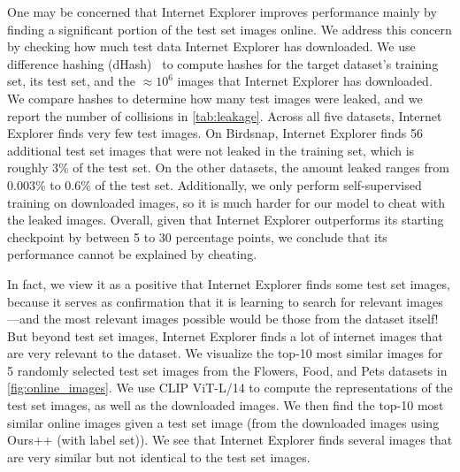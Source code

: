 One may be concerned that Internet Explorer improves performance mainly by finding a significant portion of the test set images online. We address this concern by checking how much test data Internet Explorer has downloaded. We use difference hashing (dHash)~\cite{imagehash} to compute hashes for the target dataset's training set, its test set, and the $\approx 10^6$ images that Internet Explorer has downloaded. We compare hashes to determine how many test images were leaked, and we report the number of collisions in \cref{tab:leakage}. Across all five datasets, Internet Explorer finds very few test images. On Birdsnap, Internet Explorer finds 56 additional test set images that were not leaked in the training set, which is roughly $3\%$ of the test set. On the other datasets, the amount leaked ranges from $0.003\%$ to $0.6\%$ of the test set. Additionally, we only perform self-supervised training on downloaded images, so it is much harder for our model to cheat with the leaked images. Overall, given that Internet Explorer outperforms its starting checkpoint by between 5 to 30 percentage points, we conclude that its performance cannot be explained by cheating.

In fact, we view it as a positive that Internet Explorer finds some test set images, because it serves as confirmation that it is learning to search for relevant images---and the most relevant images possible would be those from the dataset itself!
But beyond test set images, Internet Explorer finds a lot of internet images that are very relevant to the dataset. We visualize the top-10 most similar images for 5 randomly selected test set images from the Flowers, Food, and Pets datasets in \cref{fig:online_images}.  We use CLIP ViT-L/14 to compute the representations of the test set images, as well as the downloaded images. We then find the top-10 most similar online images given a test set image (from the downloaded images using Ours++ (with label set)).
We see that Internet Explorer finds several images that are very similar but not identical to the test set images.

